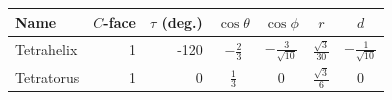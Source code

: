 \begin{center}
\small
\renewcommand{\arraystretch}{1.7}
\begin{tabular}{@{}lrrcccc@{}}
\toprule
Name & $C$-face & $\tau$ (deg.) & $\cos\theta$ & $\cos\phi$ & $r$ & $d$\\
\midrule
Tetrahelix & 1 & -120 & $\displaystyle - \frac{2}{3}$ & $\displaystyle - \frac{3}{\sqrt{10}}$ & $\displaystyle \frac{\sqrt{3}}{30}$ & $\displaystyle - \frac{1}{\sqrt{10}}$\\
Tetratorus & 1 & 0 & $\displaystyle \frac{1}{3}$ & $\displaystyle 0$ & $\displaystyle \frac{\sqrt{3}}{6}$ & $\displaystyle 0$\\
\bottomrule
\end{tabular}
\end{center}
